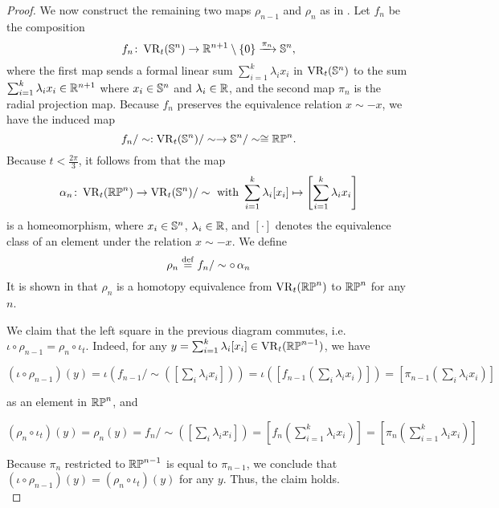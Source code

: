 \begin{proof}
	We now construct the remaining two maps $\rho_{n-1}$ and $\rho_{n}$ as in \cite[]{adams2022metric}.
	Let $f_n$ be the composition
	\[
	f_n \colon \operatorname{VR}_t(\mathbb{S}^n) \to \mathbb{R}^{n+1} \setminus \{0\} \xrightarrow{\pi_n} \mathbb{S}^{n},
	\]
	where the first map sends a formal linear sum $\sum_{i=1}^k \lambda_i x_i$ in $\operatorname{VR}_t(\mathbb{S}^n)$ to the sum $\sum_{i=1}^k \lambda_i x_i\in \mathbb{R}^{n+1}$ where $x_i\in \mathbb{S}^{n}$ and $\lambda_i\in \mathbb{R}$, and the second map $\pi_n$ is the radial projection map.
	Because $f_n$ preserves the equivalence relation $x\sim -x$, we have the induced map 
	\[
	f_n/\sim:\operatorname{VR}_t(\mathbb{S}^{n})/\sim\to \mathbb{S}^{n}/\sim\cong \mathbb{RP}^n.\]
	Because $t<\frac{2\pi}{3}$, it follows from \cite[Lemma 4.4]{adams2022metric} that the map
	\[
	\alpha_n \colon \operatorname{VR}_t(\mathbb{RP}^n)\to \operatorname{VR}_t(\mathbb{S}^n)/\sim \text{ with }
	\sum_{i=1}^k \lambda_i [x_i]\mapsto \left[\sum_{i=1}^k \lambda_i x_i\right]
	\]
	is a homeomorphism, where $x_i\in \mathbb{S}^{n}$, $\lambda_i\in \mathbb{R}$, and $[\cdot]$ denotes the equivalence class of an element under the relation $x\sim -x$. We define
	\[\rho_n\stackrel{\mathrm{def}}{=} f_n/\sim \circ\,\alpha_n\]
	It is shown in \cite[Theorem 4.5]{adams2022metric} that $\rho_n$ is a homotopy equivalence from $\operatorname{VR}_t(\mathbb{RP}^n)$ to $\mathbb{RP}^n$ for any $n$.

	We claim that the left square in the previous diagram commutes, i.e. $\iota\circ \rho_{n-1}=\rho_{n}\circ\iota_t$. Indeed, for any $y=\sum_{i=1}^k \lambda_i [x_i]\in \operatorname{VR}_t(\mathbb{RP}^{n-1})$, we have
	\begin{center}
		$(\iota\circ \rho_{n-1})(y)
		=\iota\left(f_{n-1}/\sim\left(\left[\sum_i \lambda_i x_i\right]\right)\right)
		=\iota\left(\left[f_{n-1}\left(\sum_i \lambda_i x_i\right)\right]\right)
		=\left[\pi_{n-1}\left(\sum_i \lambda_i x_i\right)\right]
		$
	\end{center}
	as an element in $\mathbb{RP}^n$, and
	\begin{center}
		$(\rho_{n}\circ\iota_t)(y)=\rho_{n}(y)=f_{n}/\sim\left(\left[\sum_i \lambda_i x_i\right]\right)=\left[f_{n}\left(\sum_{i=1}^k \lambda_i x_i\right)\right]=\left[\pi_{n}\left(\sum_{i=1}^k \lambda_i x_i\right)\right]
		$
	\end{center}
	Because $\pi_{n}$ restricted to $\mathbb{RP}^{n-1}$ is equal to $\pi_{n-1}$, we conclude that $(\iota\circ \rho_{n-1})(y)=(\rho_n\circ\iota_t)(y)$ for any $y$. Thus, the claim holds.\\


\end{proof}
